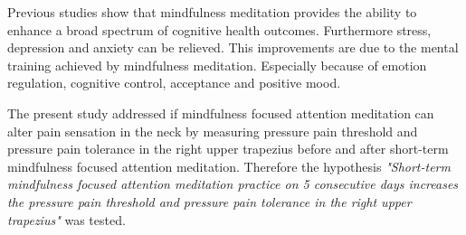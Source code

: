 Previous studies show that mindfulness meditation provides the ability to enhance a broad spectrum of cognitive health outcomes. Furthermore stress, depression and anxiety can be relieved. This improvements are due to the mental training achieved by mindfulness meditation. Especially because of emotion regulation, cognitive control, acceptance and positive mood. \cite{Zeidan2016,Zeidan2012} 


The present study addressed if mindfulness focused attention meditation can alter pain sensation in the neck by measuring pressure pain threshold and pressure pain tolerance in the right upper trapezius before and after short-term mindfulness focused attention meditation. Therefore the hypothesis  \textit{"Short-term mindfulness focused attention meditation practice on 5 consecutive days increases the pressure pain threshold and pressure pain tolerance in the right upper trapezius"} was tested.

